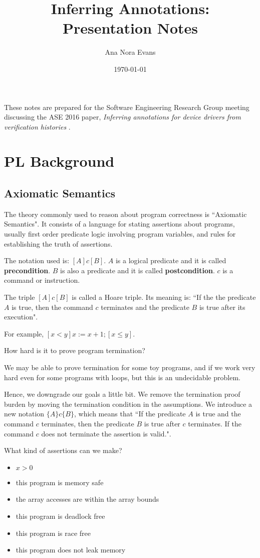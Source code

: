 \documentclass[12pt]{article}
\begin{document}
\title{Inferring Annotations: Presentation Notes}
\author{Ana Nora Evans}
\date{\today}
\maketitle
\thispagestyle{empty}

These notes are prepared for the Software Engineering Research Group meeting discussing the ASE 2016 paper, \textit{Inferring annotations for device drivers from verification histories} \cite{paper}. 

\section{PL Background}

\subsection{Axiomatic Semantics}
The theory commonly used to reason about program correctness is ``Axiomatic Semantics". It consists of a language for stating assertions about programs, usually first order predicate logic involving program variables, and rules for establishing the truth of assertions. 

The notation used is: $[A]c[B]$. $A$ is a logical predicate and it is called \textbf{precondition}. $B$ is also a predicate and it is called \textbf{postcondition}. $c$ is a command or instruction.

The triple $[A]c[B]$ is called a Hoare triple. Its meaning is: ``If the the predicate $A$ is true, then the command $c$ terminates and the predicate $B$ is true after its execution".

For example, $[x<y]x:=x+1;[x \leq y]$.

How hard is it to prove program termination?

We may be able to prove termination for some toy programs, and if we work very hard even for some programs with loops, but this is an undecidable problem.

Hence, we downgrade our goals a little bit. We remove the termination proof burden by moving the termination condition in the assumptions. We introduce a new notation $\{A\}c\{B\}$, which means that ``If the predicate $A$ is true and the command $c$ terminates, then the predicate $B$ is true after $c$ terminates. If the command $c$ does not terminate the assertion is valid.".  

What kind of assertions can we make?
\begin{itemize}
\item $x>0$
\item this program is memory safe
\item the array accesses are within the array bounds 
\item this program is deadlock free
\item this program is race free
\item this program does not leak memory
\end{itemize}
\end{document}

